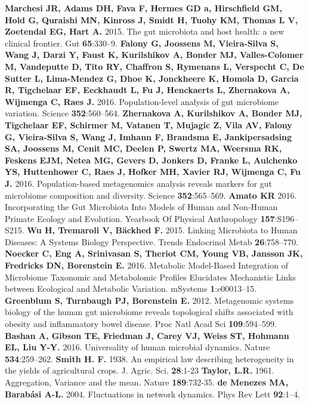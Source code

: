 \documentclass[12pt,oneside,letterpaper]{article}
\begin{document}
\begin{thebibliography}{99}
%
 {\bf Marchesi JR, Adams DH, Fava F, Hermes GD a, Hirschfield GM, Hold G, Quraishi MN, Kinross J, Smidt H, Tuohy KM, Thomas L V, Zoetendal EG, Hart A.} 2015. The gut microbiota and host health: a new clinical frontier. Gut {\bf 65}:330–9.
 {\bf Falony G, Joossens M, Vieira-Silva S, Wang J, Darzi Y, Faust K, Kurilshikov A, Bonder MJ, Valles-Colomer M, Vandeputte D, Tito RY, Chaffron S, Rymenans L, Verspecht C, De Sutter L, Lima-Mendez G, Dhoe K, Jonckheere K, Homola D, Garcia R, Tigchelaar EF, Eeckhaudt L, Fu J, Henckaerts L, Zhernakova A, Wijmenga C, Raes J.} 2016. Population-level analysis of gut microbiome variation. Science {\bf 352}:560–564.
 {\bf Zhernakova A, Kurilshikov A, Bonder MJ, Tigchelaar EF, Schirmer M, Vatanen T, Mujagic Z, Vila AV, Falony G, Vieira-Silva S, Wang J, Imhann F, Brandsma E, Jankipersadsing SA, Joossens M, Cenit MC, Deelen P, Swertz MA, Weersma RK, Feskens EJM, Netea MG, Gevers D, Jonkers D, Franke L, Aulchenko YS, Huttenhower C, Raes J, Hofker MH, Xavier RJ, Wijmenga C, Fu J.} 2016. Population-based metagenomics analysis reveals markers for gut microbiome composition and diversity. Science {\bf 352}:565–569.
 {\bf Amato KR} 2016. Incorporating the Gut Microbiota Into Models of Human and Non-Human Primate Ecology and Evolution. Yearbook Of Physical Anthropology {\bf 157}:S196–S215.
 {\bf Wu H, Tremaroli V, Bäckhed F.} 2015. Linking Microbiota to Human Diseases: A Systems Biology Perspective. Trends Endocrinol Metab {\bf 26}:758–770.
 {\bf Noecker C, Eng A, Srinivasan S, Theriot CM, Young VB, Jansson JK, Fredricks DN, Borenstein E.} 2016. Metabolic Model-Based Integration of Microbiome Taxonomic and Metabolomic Profiles Elucidates Mechanistic Links between Ecological and Metabolic Variation. mSystems {\bf 1}:e00013–15.
 {\bf Greenblum S, Turnbaugh PJ, Borenstein E.} 2012. Metagenomic systems biology of the human gut microbiome reveals topological shifts associated with obesity and inflammatory bowel disease. Proc Natl Acad Sci {\bf 109}:594–599.
 {\bf Bashan A, Gibson TE, Friedman J, Carey VJ, Weiss ST, Hohmann EL, Liu Y-Y.} 2016. Universality of human microbial dynamics. Nature {\bf 534}:259–262.
 {\bf Smith H. F.} 1938. An empirical law describing heterogeneity in the yields of agricultural crops. J. Agric. Sci. {\bf 28}:1-23
 {\bf Taylor, L.R.} 1961. Aggregation, Variance and the mean. Nature {\bf 189}:732-35.
 {\bf de Menezes MA, Barabási A-L.} 2004. Fluctuations in network dynamics. Phys Rev Lett {\bf 92}:1–4.

\end{thebibliography}
\end{document}
